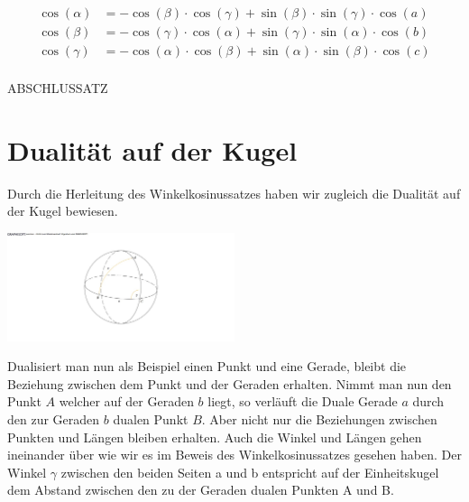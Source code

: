 \begin{refsection}
\begin{satz}
\label{skript:kugel:satz:Winkelkosinussatz}
\end{satz}

\begin{align*}
{\cos (\alpha)} &= {-\cos(\beta)} \cdot {\cos(\gamma)} + {\sin (\beta)} \cdot {\sin(\gamma)} \cdot {\cos(a)}\\
{\cos (\beta)} &= {-\cos(\gamma)} \cdot {\cos(\alpha)} + {\sin (\gamma)} \cdot {\sin(\alpha)} \cdot {\cos(b)}\\
{\cos (\gamma)} &= {-\cos(\alpha)} \cdot {\cos(\beta)} + {\sin (\alpha)} \cdot {\sin(\beta)} \cdot {\cos(c)}\\
\end{align*}

ABSCHLUSSATZ

\section{Dualität auf der Kugel}

Durch die Herleitung des Winkelkosinussatzes haben wir zugleich die Dualität auf der Kugel bewiesen.

\begin{satz}
\label{skript:kugel:satz:Dualitaet}
\end{satz}

\begin{center}
        \includegraphics[width=0.5\textwidth]{kugel/1Dualitat.jpg}
\end{center}

Dualisiert man nun als Beispiel einen Punkt und eine Gerade, bleibt die Beziehung zwischen dem Punkt und der Geraden erhalten.
Nimmt man nun den Punkt $A$ welcher auf der Geraden $b$ liegt, so verläuft die Duale Gerade $a$ durch den zur Geraden $b$ dualen Punkt $B$. 
Aber nicht nur die Beziehungen zwischen Punkten und Längen bleiben erhalten. Auch die Winkel und Längen gehen ineinander über wie wir es im Beweis des Winkelkosinussatzes gesehen haben.
Der Winkel $\gamma$ zwischen den beiden Seiten a und b entspricht auf der Einheitskugel dem Abstand zwischen den zu der Geraden dualen Punkten A und B.


\end{refsection}
